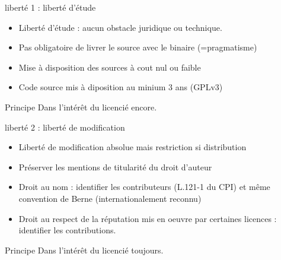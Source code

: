 \documentclass{beamer}
\begin{document}
\begin{frame}{liberté 1 : liberté d'étude}
  \begin{itemize}
  \item Liberté d'étude : aucun obstacle juridique ou technique.
  \item Pas obligatoire de livrer le source avec le binaire (=pragmatisme)
  \item Mise à disposition des sources à cout nul ou faible
  \item Code source mis à diposition au minium 3 ans (GPLv3)
  \end{itemize}
  \begin{alertblock}{Principe}
    Dans l'intérêt du licencié encore.
  \end{alertblock}
\end{frame}


\begin{frame}{liberté 2 : liberté de modification}
  \begin{itemize}
  \item Liberté de modification absolue mais restriction si distribution
  \item Préserver les mentions de titularité du droit d'auteur
  \item Droit au nom : identifier les contributeurs (L.121-1 du CPI) et même convention de Berne (internationalement reconnu)
  \item Droit au respect de la réputation mis en oeuvre par certaines licences : identifier les contributions.
  \end{itemize}
\begin{alertblock}{Principe}
    Dans l'intérêt du licencié toujours.
  \end{alertblock}
\end{frame}
\end{document}
